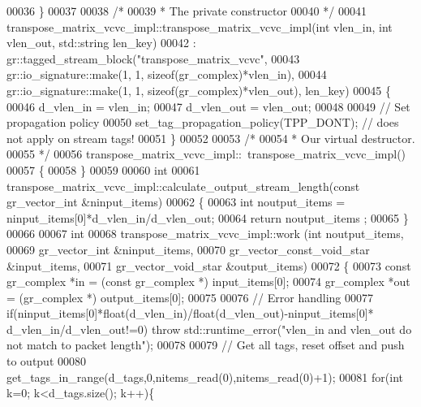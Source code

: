 \begin{DoxyCode}
00036     \}
00037 
00038     \textcolor{comment}{/*}
00039 \textcolor{comment}{     * The private constructor}
00040 \textcolor{comment}{     */}
00041     transpose_matrix_vcvc_impl::transpose_matrix_vcvc_impl(\textcolor{keywordtype}{int} vlen\_in, \textcolor{keywordtype}{int} vlen\_out, 
      std::string len\_key)
00042       : gr::tagged\_stream\_block(\textcolor{stringliteral}{"transpose\_matrix\_vcvc"},
00043               gr::io\_signature::make(1, 1, sizeof(gr\_complex)*vlen\_in),
00044               gr::io\_signature::make(1, 1, sizeof(gr\_complex)*vlen\_out), len\_key)
00045     \{
00046         d_vlen_in = vlen\_in;
00047         d_vlen_out = vlen\_out;
00048         
00049         \textcolor{comment}{// Set propagation policy}
00050         set\_tag\_propagation\_policy(TPP\_DONT); \textcolor{comment}{// does not apply on stream tags!}
00051     \}
00052 
00053     \textcolor{comment}{/*}
00054 \textcolor{comment}{     * Our virtual destructor.}
00055 \textcolor{comment}{     */}
00056     transpose_matrix_vcvc_impl::~transpose_matrix_vcvc_impl()
00057     \{
00058     \}
00059 
00060     \textcolor{keywordtype}{int}
00061     transpose_matrix_vcvc_impl::calculate_output_stream_length(\textcolor{keyword}{const} gr\_vector\_int &ninput\_items)
00062     \{
00063       \textcolor{keywordtype}{int} noutput\_items = ninput\_items[0]*d_vlen_in/d_vlen_out;
00064       \textcolor{keywordflow}{return} noutput\_items ;
00065     \}
00066 
00067     \textcolor{keywordtype}{int}
00068     transpose_matrix_vcvc_impl::work (\textcolor{keywordtype}{int} noutput\_items,
00069                        gr\_vector\_int &ninput\_items,
00070                        gr\_vector\_const\_void\_star &input\_items,
00071                        gr\_vector\_void\_star &output\_items)
00072     \{
00073         \textcolor{keyword}{const} gr\_complex *in = (\textcolor{keyword}{const} gr\_complex *) input\_items[0];
00074         gr\_complex *out = (gr\_complex *) output\_items[0];
00075         
00076         \textcolor{comment}{// Error handling}
00077         \textcolor{keywordflow}{if}(ninput\_items[0]*\textcolor{keywordtype}{float}(d_vlen_in)/float(d_vlen_out)-ninput\_items[0]*
      d_vlen_in/d_vlen_out!=0) \textcolor{keywordflow}{throw} std::runtime\_error(\textcolor{stringliteral}{"vlen\_in and vlen\_out do not match to packet length"});
00078         
00079         \textcolor{comment}{// Get all tags, reset offset and push to output}
00080         get\_tags\_in\_range(d_tags,0,nitems\_read(0),nitems\_read(0)+1);
00081         \textcolor{keywordflow}{for}(\textcolor{keywordtype}{int} k=0; k<d_tags.size(); k++)\{

\end{DoxyCode}
